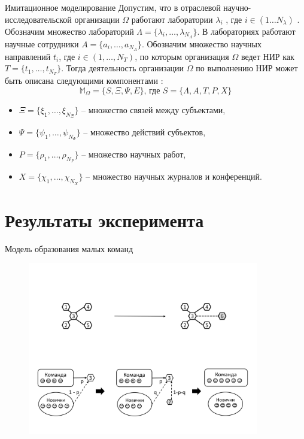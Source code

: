 \documentclass{beamer}
\begin{document}
\begin{frame}{Имитационное моделирование}
	Допустим, что в отраслевой научно-исследовательской организации $\Omega$  работают лаборатории $\lambda_i$ , где $i \in (1 \dots N_{\lambda})$ . 
	Обозначим множество лабораторий $ \Lambda = \{ \lambda_i, \dots , \lambda_{N_{\Lambda}} \}$.
	В лабораториях работают научные сотрудники $ A = \{ a_{i}, \dots, a_{N_A} \} $. Обозначим множество научных направлений $t_i$, где $i \in (1, \dots, N_T )$, по которым организация $\Omega$ ведет НИР как $T = \{ t_1, \dots , t_{N_T} \}$. Тогда деятельность организации $\Omega$ по выполнению НИР может быть описана следующими компонентами :
	\begin{equation} 
	\label{eq:so1}
	\mathbb{M}_{\Omega} = \bigg \{ S, \Xi, \Psi, E \bigg \} \mbox {, где }  S = \{ \Lambda, A, T, P, X \}
	\end{equation} 
	
	\begin{itemize}
		\item $ \Xi = \{ \xi_1 , \dots , \xi_{N_{\Xi}} \} $ -- множество связей между субъектами,
		\item $ \Psi = \{ \psi_1 , \dots , \psi_{N_{\Psi}} \} $ -- множество действий субъектов,
		\item $ P = \{ \rho_1 , \dots , \rho_{N_P} \} $ -- множество научных работ,
		\item $ X = \{ \chi_1 , \dots , \chi_{N_X}  \} $ -- множество научных журналов и конференций.
	\end{itemize}
	
\end{frame}

\section{Результаты эксперимента}

\begin{frame}{Модель образования малых команд}
	\begin{figure}
		\centering
		\includegraphics[width=0.9\textwidth]{media/bim3.png}
	\end{figure}
\end{frame}
\end{document}
